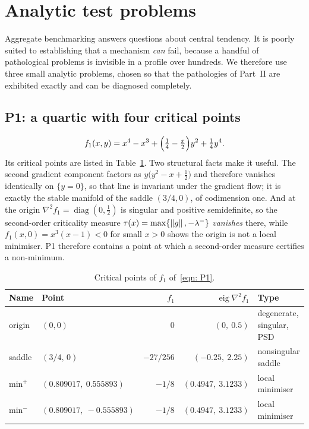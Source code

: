 \documentclass[11pt]{article}
\theoremstyle{plain}
\theoremstyle{definition}
\theoremstyle{remark}
\numberwithin{equation}{section}
\begin{document}

\section{Analytic test problems}
\label{sec: analytic problems}

Aggregate benchmarking answers questions about central tendency. It is poorly suited to
establishing that a mechanism \emph{can} fail, because a handful of pathological problems is
invisible in a profile over hundreds. We therefore use three small analytic problems, chosen so
that the pathologies of Part~II are exhibited exactly and can be diagnosed completely.

\subsection{P1: a quartic with four critical points}
\label{sec: P1}

\begin{equation}
  f_1(x,y) = x^4 - x^3 + \Bigl(\tfrac14 - \tfrac{x}{2}\Bigr) y^2 + \tfrac14 y^4 .
  \label{eqn: P1}
\end{equation}
Its critical points are listed in Table~\ref{tab: P1 critical points}. Two structural facts make
it useful. The second gradient component factors as $y\bigl(y^2 - x + \tfrac12\bigr)$ and
therefore vanishes identically on $\{y=0\}$, so that line is invariant under the gradient flow;
it is exactly the stable manifold of the saddle $(3/4,0)$, of codimension one. And at the origin
$\nabla^2 f_1 = \operatorname{diag}(0,\tfrac12)$ is singular and positive semidefinite, so the
second-order criticality measure $\tau(x) = \max\{\left \lVert g \right \rVert, -\lambda^-\}$ \emph{vanishes} there,
while $f_1(x,0) = x^3(x-1) < 0$ for small $x>0$ shows the origin is not a local minimiser. P1
therefore contains a point at which a second-order measure certifies a non-minimum.

\begin{table}[htbp]
  \centering
  \caption{Critical points of $f_1$ of~\eqref{eqn: P1}.}
  \label{tab: P1 critical points}
  \small
  \begin{tabular}{llrrl}
    \toprule
    Name & Point & $f_1$ & $\operatorname{eig}\nabla^2 f_1$ & Type \\
    \midrule
    origin & $(0,0)$ & $0$ & $(0,\ 0.5)$ & degenerate, singular, PSD \\
    saddle & $(3/4,\,0)$ & $-27/256$ & $(-0.25,\ 2.25)$ & nonsingular saddle \\
    $\text{min}^{+}$ & $(0.809017,\ 0.555893)$ & $-1/8$ & $(0.4947,\ 3.1233)$ & local minimiser \\
    $\text{min}^{-}$ & $(0.809017,\ -0.555893)$ & $-1/8$ & $(0.4947,\ 3.1233)$ & local minimiser \\
    \bottomrule
  \end{tabular}
\end{table}
\end{document}
